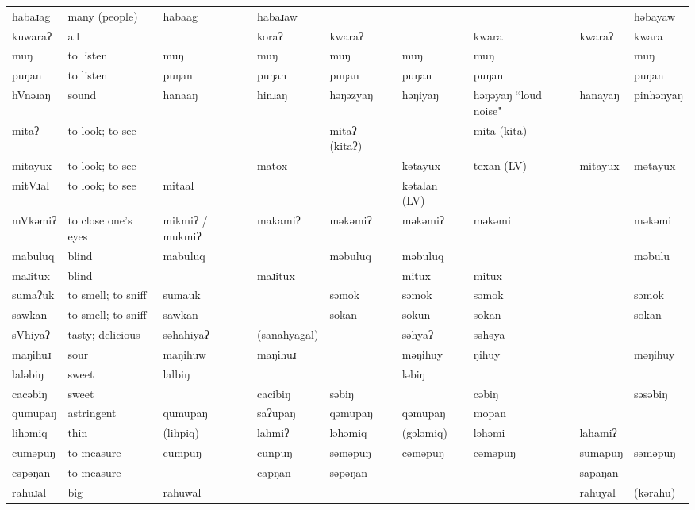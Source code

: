 \begin{landscape}
\begin{longtable}{*{9}{p{}}}
\text{*}habaɹag & many (people) & habaag & habaɹaw &  &  &  &  & həbayaw\\
\text{*}kuwaraʔ & all &  & koraʔ & kwaraʔ &  & kwara & kwaraʔ & kwara\\
\text{*}muŋ & to listen & muŋ & muŋ & muŋ & muŋ & muŋ &  & muŋ\\
\text{*}puŋan & to listen & puŋan & puŋan & puŋan & puŋan & puŋan &  & puŋan\\
\text{*}hVnəɹaŋ & sound & hanaaŋ & hinɹaŋ & həŋəzyaŋ & həŋiyaŋ & həŋəyaŋ ``loud noise" & hanayaŋ & pinhənyaŋ\\
\text{*}mitaʔ & to look; to see &  &  & mitaʔ (kitaʔ) &  & mita (kita) &  & \\
\text{*}mitayux & to look; to see &  & matox &  & kətayux & texan (LV) & mitayux & mətayux\\
\text{*}mitVɹal & to look; to see & mitaal &  &  & kətalan (LV) &  &  & \\
\text{*}mVkəmiʔ & to close one's eyes & mikmiʔ / mukmiʔ & makamiʔ & məkəmiʔ & məkəmiʔ & məkəmi &  & məkəmi\\
\text{*}mabuluq & blind & mabuluq &  & məbuluq & məbuluq &  &  & məbulu\\
\text{*}maɹitux & blind &  & maɹitux &  & mitux & mitux &  & \\
\text{*}sumaʔuk & to smell; to sniff & sumauk &  & səmok & səmok & səmok &  & səmok\\
\text{*}sawkan & to smell; to sniff & sawkan &  & sokan & sokun & sokan &  & sokan\\
\text{*}sVhiyaʔ & tasty; delicious & səhahiyaʔ & (sanahyagal) &  & səhyaʔ & səhəya &  & \\
\text{*}maŋihuɹ & sour & maŋihuw & maŋihuɹ &  & məŋihuy & ŋihuy &  & məŋihuy\\
\text{*}laləbiŋ & sweet & lalbiŋ &  &  & ləbiŋ &  &  & \\
\text{*}cacəbiŋ & sweet &  & cacibiŋ & səbiŋ &  & cəbiŋ &  & səsəbiŋ\\
\text{*}qumupaŋ & astringent & qumupaŋ & saʔupaŋ & qəmupaŋ & qəmupaŋ & mopan &  & \\
\text{*}lihəmiq & thin & (lihpiq) & lahmiʔ & ləhəmiq & (gələmiq) & ləhəmi & lahamiʔ & \\
\text{*}cuməpuŋ & to measure & cumpuŋ & cunpuŋ & səməpuŋ & cəməpuŋ & cəməpuŋ & sumapuŋ & səməpuŋ\\
\text{*}cəpəŋan & to measure &  & capŋan & səpəŋan &  &  & sapaŋan & \\
\text{*}rahuɹal & big & rahuwal &  &  &  &  & rahuyal & (kərahu)\\

\end{longtable}
\end{landscape}
